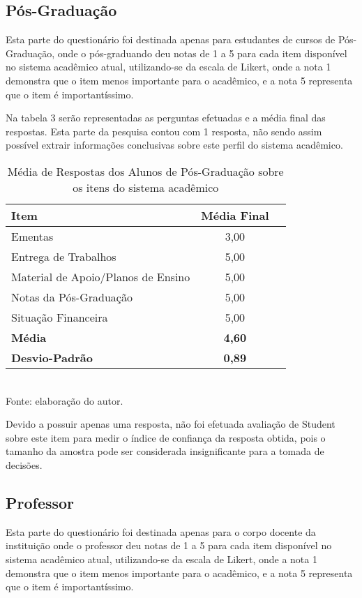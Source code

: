 \subsection{Pós-Graduação}
Esta parte do questionário foi destinada apenas para estudantes de cursos de Pós-Graduação, onde o pós-graduando deu notas de 1 a 5 para cada item disponível no sistema acadêmico atual, utilizando-se da escala de Likert, onde  a nota 1 demonstra que o item menos importante para o acadêmico, e a nota 5 representa que o item é importantíssimo.

Na tabela 3 serão representadas as perguntas efetuadas e a média final das respostas. Esta parte da pesquisa contou com 1 resposta, não sendo assim possível extrair informações conclusivas sobre este perfil do sistema acadêmico.

\begin{table}[!hbt]
\centering
\caption[Média de Respostas dos Alunos de Pós-Graduação]{Média de Respostas dos Alunos de Pós-Graduação sobre os itens do sistema acadêmico}
\vspace{3mm}
\begin{tabular}{|p{9.5cm}|c|c|}\hline
\textbf{Item} & \textbf{Média Final} \\ \hline
Ementas & 3,00 \\ \hline
Entrega de Trabalhos & 5,00 \\ \hline
Material de Apoio/Planos de Ensino & 5,00 \\ \hline
Notas da Pós-Graduação & 5,00 \\ \hline
Situação Financeira & 5,00 \\ \hline
\textbf{Média} & \textbf{4,60} \\ \hline
\textbf{Desvio-Padrão} & \textbf{0,89} \\ \hline
\end{tabular}
\\ Fonte: elaboração do autor.
\end{table}

Devido a possuir apenas uma resposta, não foi efetuada avaliação de Student sobre este item para medir o índice de confiança da resposta obtida, pois o tamanho da amostra pode ser considerada insignificante para a tomada de decisões.

\subsection{Professor}
Esta parte do questionário foi destinada apenas para o corpo docente da instituição onde o professor deu notas de 1 a 5 para cada item disponível no sistema acadêmico atual, utilizando-se da escala de Likert, onde  a nota 1 demonstra que o item menos importante para o acadêmico, e a nota 5 representa que o item é importantíssimo.

